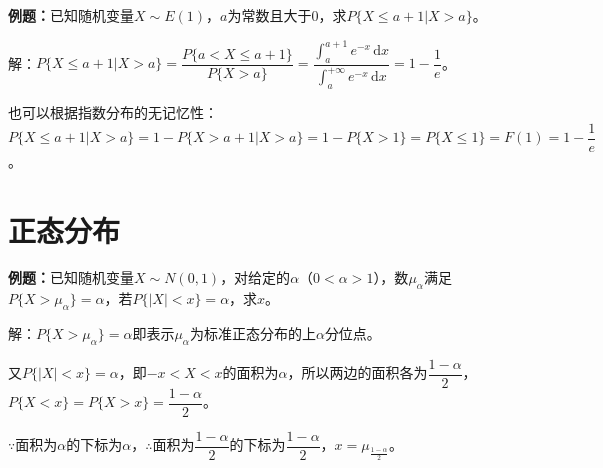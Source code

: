 \documentclass[UTF8, 12pt]{ctexart}
\begin{document}
\textbf{例题：}已知随机变量$X\sim E(1)$，$a$为常数且大于0，求$P\{X\leqslant a+1|X>a\}$。

解：$P\{X\leqslant a+1|X>a\}=\dfrac{P\{a<X\leqslant a+1\}}{P\{X>a\}}=\dfrac{\int_a^{a+1}e^{-x}\,\textrm{d}x}{\int_a^{+\infty}e^{-x}\,\textrm{d}x}=1-\dfrac{1}{e}$。

也可以根据指数分布的无记忆性：$P\{X\leqslant a+1|X>a\}=1-P\{X>a+1|X>a\}=1-P\{X>1\}=P\{X\leqslant1\}=F(1)=1-\dfrac{1}{e}$。

\section{正态分布}

\textbf{例题：}已知随机变量$X\sim N(0,1)$，对给定的$\alpha$（$0<\alpha>1$），数$\mu_\alpha$满足$P\{X>\mu_\alpha\}=\alpha$，若$P\{\vert X\vert<x\}=\alpha$，求$x$。

解：$P\{X>\mu_\alpha\}=\alpha$即表示$\mu_\alpha$为标准正态分布的上$\alpha$分位点。

又$P\{\vert X\vert<x\}=\alpha$，即$-x<X<x$的面积为$\alpha$，所以两边的面积各为$\dfrac{1-\alpha}{2}$，$P\{X<x\}=P\{X>x\}=\dfrac{1-\alpha}{2}$。

$\because$面积为$\alpha$的下标为$\alpha$，$\therefore$面积为$\dfrac{1-\alpha}{2}$的下标为$\dfrac{1-\alpha}{2}$，$x=\mu_\frac{1-\alpha}{2}$。
\end{document}
